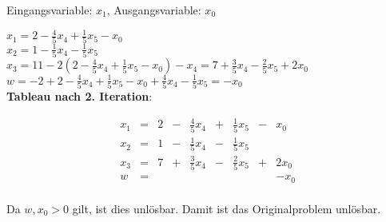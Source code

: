 \documentclass[a4paper,11pt]{article}
\begin{document}
\begin{enumerate}
\begin{enumerate}
        Eingangsvariable: $x_1$, Ausgangsvariable: $x_0$

        \( x_1 = 2 - \frac{4}{5}x_4 + \frac{1}{5}x_5 - x_0 \)\\[3pt]
        \( x_2 = 1 - \frac{1}{5}x_4 - \frac{1}{5}x_5 \)\\[3pt]
        \( x_3 = 11 - 2 \left( 2 - \frac{4}{5}x_4 + \frac{1}{5}x_5 - x_0 \right) - x_4 =
            7 + \frac{3}{5}x_4 - \frac{2}{5}x_5 + 2x_0 \)\\[3pt]
        \( w = -2 + 2 - \frac{4}{5}x_4 + \frac{1}{5}x_5 - x_0 + \frac{4}{5}x_4 - \frac{1}{5}x_5 = -x_0 \)\\[3pt]

        \textbf{Tableau nach 2. Iteration}:

        \[\begin{array}{rcrcrcrcr}
            x_1 & = & 2 & - & \frac{4}{5}x_4 & + & \frac{1}{5}x_5 & - & x_0 \\[3pt]
            x_2 & = & 1 & - & \frac{1}{5}x_4 & - & \frac{1}{5}x_5 & & \\[3pt]
            x_3 & = & 7 & + & \frac{3}{5}x_4 & - & \frac{2}{5}x_5 & + & 2x_0 \\[3pt] \hline
              w & = &  & & & & & & -x_0 \\[3pt]
        \end{array}\]

        Da $w, x_0 > 0$ gilt, ist dies unlösbar. Damit ist das Originalproblem
        unlösbar.

    \end{enumerate}
\end{enumerate}
\end{document}
